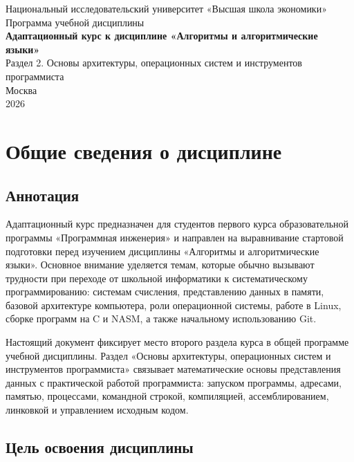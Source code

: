 \documentclass[a4paper,14pt]{extreport}
\begin{document}
\hypersetup{pageanchor=false}
\begin{titlepage}
    \centering
    {\large Национальный исследовательский университет «Высшая школа экономики»\\}
    \vspace{2cm}
    {\Large Программа учебной дисциплины\\}
    \vspace{1cm}
    {\LARGE \textbf{Адаптационный курс к дисциплине «Алгоритмы и алгоритмические языки»}\\}
    \vspace{1cm}
    {\large Раздел 2. Основы архитектуры, операционных систем и инструментов программиста\\}
    \vfill
    {Москва\\2026}
\end{titlepage}
\hypersetup{pageanchor=true}

\tableofcontents
\newpage

\chapter{Общие сведения о дисциплине}

\section{Аннотация}

Адаптационный курс предназначен для студентов первого курса образовательной программы «Программная инженерия» и направлен на выравнивание стартовой подготовки перед изучением дисциплины «Алгоритмы и алгоритмические языки». Основное внимание уделяется темам, которые обычно вызывают трудности при переходе от школьной информатики к систематическому программированию: системам счисления, представлению данных в памяти, базовой архитектуре компьютера, роли операционной системы, работе в Linux, сборке программ на C и NASM, а также начальному использованию Git.

Настоящий документ фиксирует место второго раздела курса в общей программе учебной дисциплины. Раздел «Основы архитектуры, операционных систем и инструментов программиста» связывает математические основы представления данных с практической работой программиста: запуском программы, адресами, памятью, процессами, командной строкой, компиляцией, ассемблированием, линковкой и управлением исходным кодом.

\section{Цель освоения дисциплины}
\end{document}
